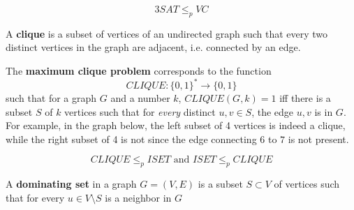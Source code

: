 \documentclass{article}
\begin{document}
  \begin{theorem}
  \[3SAT \leq_p VC\]
  \end{theorem}

  \begin{definition}
  A \textbf{clique} is a subset of vertices of an undirected graph such that every two distinct vertices in the graph are adjacent, i.e. connected by an edge. 

  The \textbf{maximum clique problem} corresponds to the function 
  \[CLIQUE: \{0,1\}^* \longrightarrow \{0,1\}\]
  such that for a graph $G$ and a number $k$, $CLIQUE(G, k) = 1$ iff there is a subset $S$ of $k$ vertices such that for \textit{every} distinct $u, v \in S$, the edge $u, v$ is in $G$. For example, in the graph below, the left subset of 4 vertices is indeed a clique, while the right subset of 4 is not since the edge connecting $6$ to $7$ is not present. 
  \begin{center}
  \end{center}
  \end{definition}

  \begin{theorem}
  \[CLIQUE \leq_p ISET \text{ and } ISET \leq_p CLIQUE\]
  \end{theorem}

  \begin{definition}
  A \textbf{dominating set} in a graph $G = (V, E)$ is a subset $S \subset V$ of vertices such that for every $u \in V \setminus S$ is a neighbor in $G$ 
  \end{definition}
\end{document}
